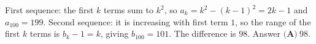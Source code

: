 First sequence: the first $k$ terms sum to $k^2$, so $a_k=k^2-(k-1)^2=2k-1$ and $a_{100}=199$. Second sequence: it is increasing with first term $1$, so the range of the first $k$ terms is $b_k-1=k$, giving $b_{100}=101$. The difference is $98$. Answer $\boxed{\textbf{(A)}\ 98}$.
